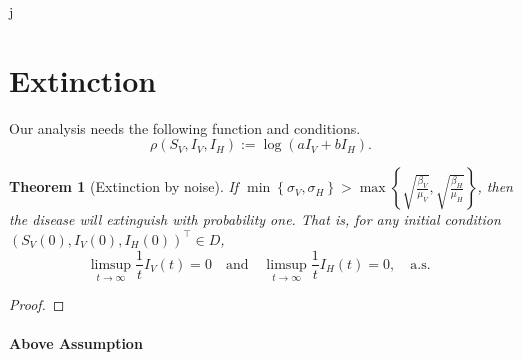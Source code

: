 j\documentclass{amsart}
\theoremstyle{plain}
\newtheorem{theorem}{Theorem}
\theoremstyle{definition}
\begin{document}
    \section{Extinction}
        Our analysis needs the following function and conditions.
        \begin{equation}
            \rho (S_V, I_V, I_H) := \log (a I_V + b I_H) .
        \end{equation}
%
%
%
%
%
        \begin{theorem}[Extinction by noise]
                If 
                $
                    \displaystyle
                    \min
                        \left \{
                              \sigma_V, \sigma_H 
                        \right\} 
                        > 
                    \max 
                        \left \{
                            \sqrt{\frac{\beta_V}{\mu_V}},
                            \sqrt{\frac{\beta_H}{\mu_H}}
                        \right \}
                $,
                then the disease will extinguish with probability one.  That is,
                for any initial condition $(S_V(0), I_V(0), I_H(0)) ^{\top} \in 
                D$,
                $$
                    \limsup_{t \to \infty} 
                        \frac{1}{t} I_V(t) = 0 
                        \quad \text{and} \quad
                    \limsup_{t \to \infty} 
                        \frac{1}{t} I_H(t) = 0, \quad 
                        \text{
                           a.s.
                        }
                $$
        \end{theorem}        
        \begin{proof}
        
        \end{proof}
%
%
%
%
    \paragraph{Above Assumption}
\end{document}
